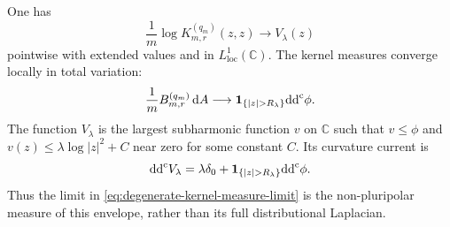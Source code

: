 \begin{theorem}\label{thm:degenerate-growing-kernel-limit}
One has
\[
 \frac1m\log K_{m,r}^{(q_m)}(z,z)\longrightarrow V_\lambda(z)
\]
pointwise with extended values and in $L^1_{\mathrm{loc}}(\mathbb C)$. The kernel measures converge locally in total variation:
\begin{equation}\label{eq:degenerate-kernel-measure-limit}
 \frac1m B_{m,r}^{(q_m)}\,\mathrm{d}A
 \longrightarrow\mathbf1_{\{|z|>R_\lambda\}}\ddc\phi.
\end{equation}
The function $V_\lambda$ is the largest subharmonic function $v$ on $\mathbb C$ such that $v\leq\phi$ and $v(z)\leq\lambda\log|z|^2+C$ near zero for some constant $C$. Its curvature current is
\begin{equation}\label{eq:degenerate-envelope-current}
 \ddc V_\lambda=\lambda\delta_0+
                  \mathbf1_{\{|z|>R_\lambda\}}\ddc\phi.
\end{equation}
Thus the limit in \eqref{eq:degenerate-kernel-measure-limit} is the non-pluripolar measure of this envelope, rather than its full distributional Laplacian.
\end{theorem}
